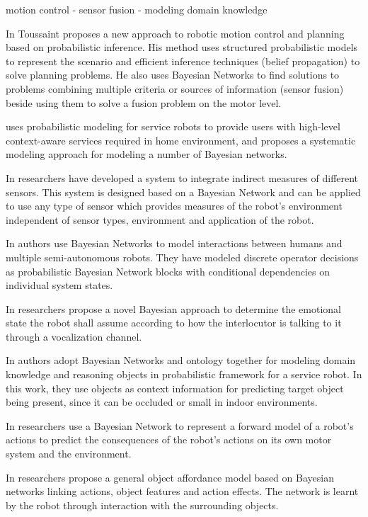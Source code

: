 \documentclass[11pt]{article}
\begin{document}
motion control - sensor fusion - modeling domain knowledge

In \cite{toussaint:bayesian-motion-planning} Toussaint proposes a new approach
to robotic motion control and planning based on probabilistic inference. His
method uses structured probabilistic models to represent the scenario and
efficient inference techniques (belief propagation) to solve planning problems.
He also uses Bayesian Networks to find solutions to problems combining multiple
criteria or sources of information (sensor fusion) beside using them to solve a
fusion problem on the motor level.

\cite{park:bn-service-robot} uses probabilistic modeling for service robots to
provide users with high-level context-aware services required in home
environment, and proposes a systematic modeling approach for modeling a number
of Bayesian networks.

In \cite{orozco:multisensor-bn} researchers have developed a system to integrate
indirect measures of different sensors. This system is designed based on a
Bayesian Network and can be applied to use any type of sensor which provides
measures of the robot's environment independent of sensor types, environment and
application of the robot.

In \cite{bourgault:operator-multiple-robot} authors use Bayesian Networks to
model interactions between humans and multiple semi-autonomous robots. They have
modeled discrete operator decisions as probabilistic Bayesian Network blocks
with conditional dependencies on individual system states.

In \cite{prado:robot-emotion-bayesian} researchers propose a novel Bayesian
approach to determine the emotional state the robot shall assume according to
how the interlocutor is talking to it through a vocalization channel.

In \cite{song:bn-service-robot} authors adopt Bayesian Networks and ontology
together for modeling domain knowledge and reasoning objects in probabilistic
framework for a service robot. In this work, they use objects as context
information for predicting target object being present, since it can be occluded
or small in indoor environments.

In \cite{dearden:forward-model-robot} researchers use a Bayesian Network to
represent a forward model of a robot's actions to predict the consequences of
the robot's actions on its own motor system and the environment.

In \cite{montesano:affordances-bn} researchers propose a general object
affordance model based on Bayesian networks linking actions, object features and
action effects. The network is learnt by the robot through interaction with the
surrounding objects.
\end{document}
